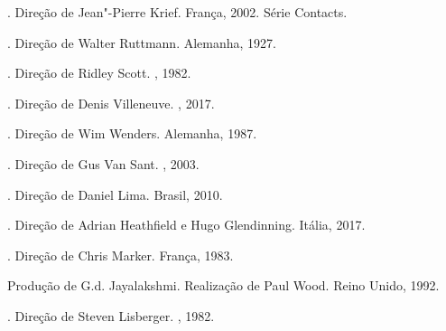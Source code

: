 \begin{bibliohedra}
. Direção de Jean"-Pierre Krief. França, 2002. Série
Contacts.

. Direção de Walter Ruttmann. Alemanha,
1927.

. Direção de Ridley Scott. , 1982.

. Direção de Denis Villeneuve. , 2017.

. Direção de Wim Wenders. Alemanha, 1987.

. Direção de Gus Van Sant. , 2003.

. Direção de Daniel Lima. Brasil, 2010. %

. Direção de Adrian Heathfield e Hugo Glendinning. Itália, 2017.

. Direção de Chris Marker. França, 1983.

 Produção de G.d. Jayalakshmi.
Realização de Paul Wood. Reino Unido, 1992.

. Direção de Steven Lisberger. , 1982.
\end{bibliohedra}